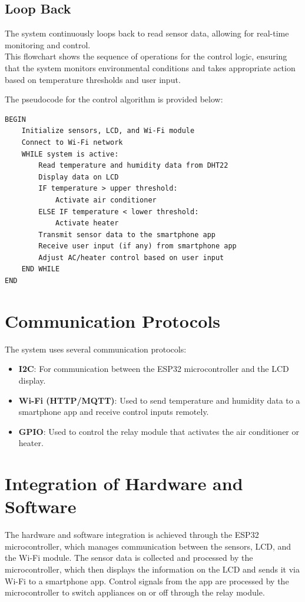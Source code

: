 \documentclass[a4paper,12pt]{article}
\begin{document}
\subsection*{Loop Back}
The system continuously loops back to read sensor data, allowing for real-time monitoring and control.
\\[1\baselineskip]
This flowchart shows the sequence of operations for the control logic, ensuring that the system monitors environmental conditions and takes appropriate action based on temperature thresholds and user input.





\newpage
The pseudocode for the control algorithm is provided below:

\begin{verbatim}
BEGIN
    Initialize sensors, LCD, and Wi-Fi module
    Connect to Wi-Fi network
    WHILE system is active:
        Read temperature and humidity data from DHT22
        Display data on LCD
        IF temperature > upper threshold:
            Activate air conditioner
        ELSE IF temperature < lower threshold:
            Activate heater
        Transmit sensor data to the smartphone app
        Receive user input (if any) from smartphone app
        Adjust AC/heater control based on user input
    END WHILE
END
\end{verbatim}

\section{Communication Protocols}
The system uses several communication protocols:
\begin{itemize}
    \item \textbf{I2C}: For communication between the ESP32 microcontroller and the LCD display.
    \item \textbf{Wi-Fi (HTTP/MQTT)}: Used to send temperature and humidity data to a smartphone app and receive control inputs remotely.
    \item \textbf{GPIO}: Used to control the relay module that activates the air conditioner or heater.
\end{itemize}

\section{Integration of Hardware and Software}
The hardware and software integration is achieved through the ESP32 microcontroller, which manages communication between the sensors, LCD, and the Wi-Fi module. The sensor data is collected and processed by the microcontroller, which then displays the information on the LCD and sends it via Wi-Fi to a smartphone app. Control signals from the app are processed by the microcontroller to switch appliances on or off through the relay module.
\end{document}
